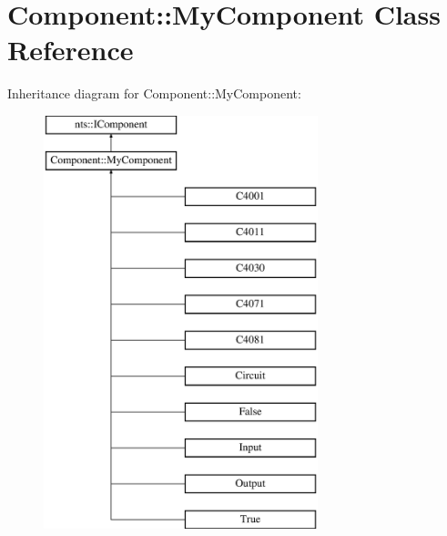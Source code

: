 \hypertarget{classComponent_1_1MyComponent}{}\section{Component\+:\+:My\+Component Class Reference}
\label{classComponent_1_1MyComponent}
Inheritance diagram for Component\+:\+:My\+Component\+:\begin{figure}[H]
\begin{center}
\leavevmode
\includegraphics[height=12.000000cm]{classComponent_1_1MyComponent}
\end{center}
\end{figure}
